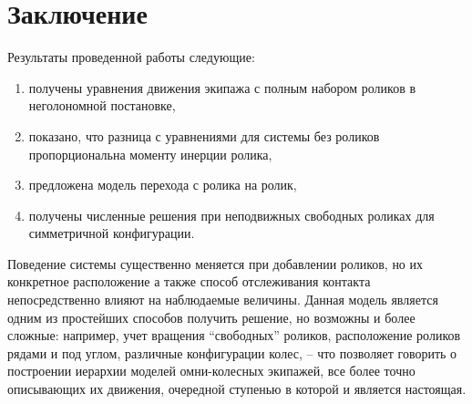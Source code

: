 






%





\section{Заключение}

Результаты проведенной работы следующие:
\begin{enumerate}
    \item получены уравнения движения экипажа с полным набором роликов в неголономной постановке,

    \item показано, что разница с уравнениями для системы без роликов пропорциональна моменту инерции ролика,

    \item предложена модель перехода с ролика на ролик,

    \item получены численные решения при неподвижных свободных роликах для симметричной конфигурации.
\end{enumerate}

Поведение системы существенно меняется при добавлении роликов, но их конкретное расположение а также способ отслеживания контакта непосредственно влияют на наблюдаемые величины. Данная модель является одним из простейших способов получить решение, но возможны и более сложные: например, учет вращения ``свободных'' роликов, расположение роликов рядами и под углом, различные конфигурации колес, -- что позволяет говорить о построении иерархии моделей омни-колесных экипажей, все более точно описывающих их движения, очередной ступенью в которой и является настоящая.














